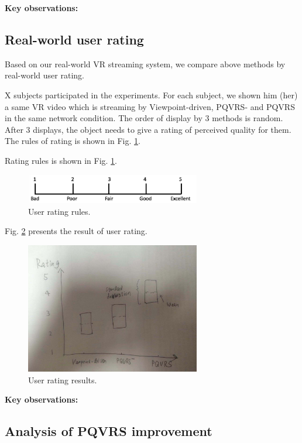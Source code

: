 \textbf{Key observations:}

\subsection{Real-world user rating}

Based on our real-world VR streaming system, we compare above methods by real-world user rating. 

X subjects participated in the experiments. For each subject, we shown him (her) a same VR video which is streaming by Viewpoint-driven, PQVRS- and PQVRS in the same network condition. The order of display by 3 methods is random. After 3 displays, the object needs to give a rating of perceived quality for them. The rules of rating is shown in Fig. \ref{rating_rules}.

Rating rules is shown in Fig. \ref{rating_rules}. 

    \begin{figure}
  \centering
  \includegraphics[width=3in]{images/rating.jpg}
  \caption{User rating rules.}
  \label{rating_rules}
  \end{figure}

Fig. \ref{rating_res} presents the result of user rating.

    \begin{figure}
  \centering
  \includegraphics[width=3in]{images/rating_res.jpeg}
  \caption{User rating results.}
  \label{rating_res}
  \end{figure}

\textbf{Key observations:}

\subsection{Analysis of PQVRS improvement}


